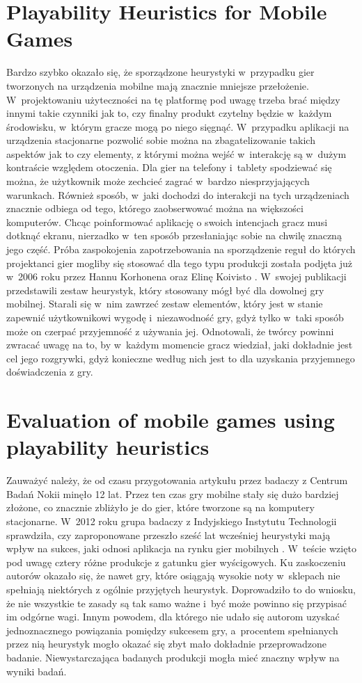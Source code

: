 \documentclass[a4paper,12pt,numbers=noenddot]{report}
\begin{document}
\section{Playability Heuristics for Mobile Games}
Bardzo szybko okazało się, że sporządzone heurystyki w~przypadku gier tworzonych na urządzenia mobilne mają znacznie mniejsze przełożenie. W~projektowaniu użyteczności na tę platformę pod uwagę trzeba brać między innymi takie czynniki jak to, czy finalny produkt czytelny będzie w~każdym środowisku, w~którym gracze mogą po niego sięgnąć. W~przypadku aplikacji na urządzenia stacjonarne pozwolić sobie można na zbagatelizowanie takich aspektów jak to czy elementy, z którymi można wejść w~interakcję są w~dużym kontraście względem otoczenia. Dla gier na telefony i~tablety spodziewać się można, że użytkownik może zechcieć zagrać w~bardzo niesprzyjających warunkach. Również sposób, w~jaki dochodzi do interakcji na tych urządzeniach znacznie odbiega od tego, którego zaobserwować można na większości komputerów. Chcąc poinformować aplikację o swoich intencjach gracz musi dotknąć ekranu, nierzadko w~ten sposób przesłaniając sobie na chwilę znaczną jego część. 
Próba zaspokojenia zapotrzebowania na sporządzenie reguł do których projektanci gier mogliby się stosować dla tego typu produkcji została podjęta już w~2006 roku przez Hannu Korhonena oraz Elinę Koivisto \cite{art_playabilityHeuristics}. W~swojej publikacji przedstawili zestaw heurystyk, który stosowany mógł być dla dowolnej gry mobilnej. Starali się w~nim zawrzeć zestaw elementów, który jest w stanie zapewnić użytkownikowi wygodę i~niezawodność gry, gdyż tylko w~taki sposób może on czerpać przyjemność z używania jej. Odnotowali, że twórcy powinni zwracać uwagę na to, by w~każdym momencie gracz wiedział, jaki dokładnie jest cel jego rozgrywki, gdyż konieczne według nich jest to dla uzyskania przyjemnego doświadczenia z gry.

\section{Evaluation of mobile games using playability heuristics}
Zauważyć należy, że od czasu przygotowania artykułu przez badaczy z Centrum Badań Nokii minęło 12 lat. Przez ten czas gry mobilne stały się dużo bardziej złożone, co znacznie zbliżyło je do gier, które tworzone są na komputery stacjonarne. W~2012 roku grupa badaczy z Indyjskiego Instytutu Technologii sprawdziła, czy zaproponowane przeszło sześć lat wcześniej heurystyki mają wpływ na sukces, jaki odnosi aplikacja na rynku gier mobilnych  \cite{art_evaluationOfMG}. W~teście wzięto pod uwagę cztery różne produkcje z gatunku gier wyścigowych. Ku zaskoczeniu autorów okazało się, że nawet gry, które osiągają wysokie noty w~sklepach nie spełniają niektórych z ogólnie przyjętych heurystyk. Doprowadziło to do wniosku, że nie wszystkie te zasady są tak samo ważne i~być może powinno się przypisać im odgórne wagi. Innym powodem, dla którego nie udało się autorom uzyskać jednoznacznego powiązania pomiędzy sukcesem gry, a~procentem spełnianych przez nią heurystyk mogło okazać się zbyt mało dokładnie przeprowadzone badanie. Niewystarczająca badanych produkcji mogła mieć znaczny wpływ na wyniki badań.
\end{document}
